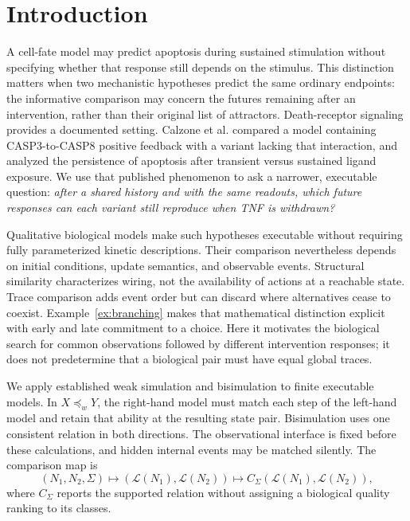 \documentclass{ws-jbcb}
\numberwithin{equation}{section}
\newcommand{\LTS}{\mathcal{L}}
\newcommand{\weakpre}{\mathrel{\preceq_{w}}}
\begin{document}
\section{Introduction}\label{sec:introduction}

A cell-fate model may predict apoptosis during sustained stimulation without
specifying whether that response still depends on the stimulus. This distinction
matters when two mechanistic hypotheses predict the same ordinary endpoints:
the informative comparison may concern the futures remaining after an
intervention, rather than their original list of attractors. Death-receptor
signaling provides a documented setting. Calzone et al. compared a model
containing CASP3-to-CASP8 positive feedback with a variant lacking that
interaction, and analyzed the persistence of apoptosis after transient versus
sustained ligand exposure.\cite{Calzone2010} We use that published phenomenon
to ask a narrower, executable question: \emph{after a shared history and with
the same readouts, which future responses can each variant still reproduce
when TNF is withdrawn?}

Qualitative biological models make such hypotheses executable without requiring
fully parameterized kinetic descriptions.\cite{ChaouiyaPetriBio2007,Li2006,Fisher2007}
Their comparison nevertheless depends on initial conditions, update semantics,
and observable events. Structural similarity characterizes wiring, not the
availability of actions at a reachable state.\cite{Szawulak2022} Trace comparison
adds event order but can discard where alternatives cease to coexist.
Example~\ref{ex:branching} makes that mathematical distinction explicit with
early and late commitment to a choice. Here it motivates the biological
search for common observations followed by different intervention responses;
it does not predetermine that a biological pair must have equal global traces.

We apply established weak simulation and bisimulation\cite{Milner1989,Sangiorgi2011}
to finite executable models. In $X\weakpre Y$, the right-hand model must match
each step of the left-hand model and retain that ability at the resulting
state pair. Bisimulation uses one consistent relation in both directions.
The observational interface is fixed before these calculations, and hidden
internal events may be matched silently. The comparison map is
\begin{equation}\label{eq:comparison-map}
 (N_1,N_2,\Sigma)\longmapsto(\LTS(N_1),\LTS(N_2))
 \longmapsto C_\Sigma(\LTS(N_1),\LTS(N_2)),
\end{equation}
where $C_\Sigma$ reports the supported relation without assigning a biological
quality ranking to its classes.
\end{document}
